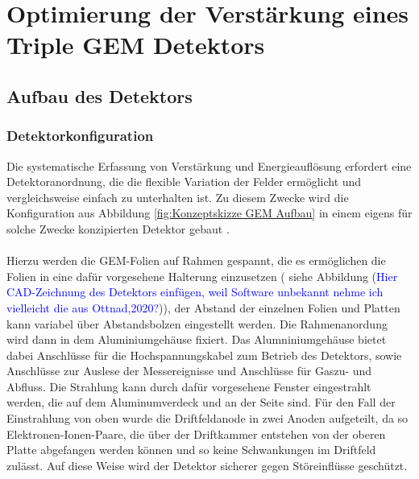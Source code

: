 \chapter{Optimierung der Verstärkung eines Triple GEM Detektors}

	\section{Aufbau des Detektors}
		\subsection{Detektorkonfiguration}
	Die systematische Erfassung von Verstärkung und Energieauflösung erfordert eine Detektoranordnung, die die flexible Variation der Felder ermöglicht und vergleichsweise einfach zu unterhalten ist. Zu diesem Zwecke wird die Konfiguration aus Abbildung \ref{fig:Konzeptskizze GEM Aufbau} in einem eigens für solche Zwecke konzipierten Detektor gebaut \cite{DetektorPrototyp}. \\
	\\
	 Hierzu werden die GEM-Folien auf Rahmen gespannt, die es ermöglichen die Folien in eine dafür vorgesehene Halterung einzusetzen ( siehe Abbildung (\textcolor{blue}{Hier CAD-Zeichnung des Detektors einfügen, weil Software unbekannt nehme ich vielleicht die aus Ottnad,2020?})), der Abstand der einzelnen Folien und Platten kann variabel über Abstandsbolzen eingestellt werden. Die Rahmenanordung wird dann in dem Aluminiumgehäuse fixiert. Das Alumniniumgehäuse bietet dabei Anschlüsse für die Hochspannungskabel zum Betrieb des Detektors, sowie Anschlüsse zur Auslese der Messereignisse und Anschlüsse für Gaszu- und Abfluss. Die Strahlung kann durch dafür vorgesehene Fenster eingestrahlt werden, die auf dem Aluminumverdeck und an der Seite sind. Für den Fall der Einstrahlung von oben wurde die Driftfeldanode in zwei Anoden aufgeteilt, da so Elektronen-Ionen-Paare, die über der Driftkammer entstehen von der oberen Platte abgefangen werden können und so keine Schwankungen im Driftfeld zulässt. Auf diese Weise wird der Detektor sicherer gegen Störeinflüsse geschützt.

